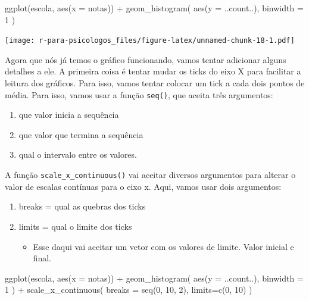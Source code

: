 \documentclass[
]{book}
\newenvironment{Shaded}{\begin{snugshade}}{\end{snugshade}}
\newcommand{\AttributeTok}[1]{\textcolor[rgb]{0.77,0.63,0.00}{#1}}
\newcommand{\DecValTok}[1]{\textcolor[rgb]{0.00,0.00,0.81}{#1}}
\newcommand{\FunctionTok}[1]{\textcolor[rgb]{0.00,0.00,0.00}{#1}}
\newcommand{\NormalTok}[1]{#1}
\newcommand{\SpecialCharTok}[1]{\textcolor[rgb]{0.00,0.00,0.00}{#1}}
\providecommand{\tightlist}{%
  \setlength{\itemsep}{0pt}\setlength{\parskip}{0pt}}
\begin{document}
\begin{Shaded}
\begin{Highlighting}[]
\FunctionTok{ggplot}\NormalTok{(escola, }\FunctionTok{aes}\NormalTok{(}\AttributeTok{x =}\NormalTok{ notas)) }\SpecialCharTok{+} 
  \FunctionTok{geom\_histogram}\NormalTok{(}
    \FunctionTok{aes}\NormalTok{(}\AttributeTok{y =}\NormalTok{ ..count..),}
    \AttributeTok{binwidth =} \DecValTok{1}
\NormalTok{  )}
\end{Highlighting}
\end{Shaded}

\texttt{[image: r-para-psicologos\_files/figure-latex/unnamed-chunk-18-1.pdf]}

Agora que nós já temos o gráfico funcionando, vamos tentar adicionar alguns detalhes a ele. A primeira coisa é tentar mudar os ticks do eixo X para facilitar a leitura dos gráficos. Para isso, vamos tentar colocar um tick a cada dois pontos de média. Para isso, vamos usar a função \texttt{seq()}, que aceita três argumentos:

\begin{enumerate}
\def\labelenumi{\arabic{enumi}.}
\tightlist
\item
  que valor inicia a sequência
\item
  que valor que termina a sequência
\item
  qual o intervalo entre os valores.
\end{enumerate}

A função \texttt{scale\_x\_continuous()} vai aceitar diversos argumentos para alterar o valor de escalas contínuas para o eixo x. Aqui, vamos usar dois argumentos:

\begin{enumerate}
\def\labelenumi{\arabic{enumi}.}
\tightlist
\item
  breaks = qual as quebras dos ticks
\item
  limits = qual o limite dos ticks

  \begin{itemize}
  \tightlist
  \item
    Esse daqui vai aceitar um vetor com os valores de limite. Valor inicial e final.
  \end{itemize}
\end{enumerate}

\begin{Shaded}
\begin{Highlighting}[]
\FunctionTok{ggplot}\NormalTok{(escola, }\FunctionTok{aes}\NormalTok{(}\AttributeTok{x =}\NormalTok{ notas)) }\SpecialCharTok{+} 
  \FunctionTok{geom\_histogram}\NormalTok{(}
    \FunctionTok{aes}\NormalTok{(}\AttributeTok{y =}\NormalTok{ ..count..),}
    \AttributeTok{binwidth =} \DecValTok{1}
\NormalTok{  ) }\SpecialCharTok{+}
  \FunctionTok{scale\_x\_continuous}\NormalTok{(}
    \AttributeTok{breaks =} \FunctionTok{seq}\NormalTok{(}\DecValTok{0}\NormalTok{, }\DecValTok{10}\NormalTok{, }\DecValTok{2}\NormalTok{),}
    \AttributeTok{limits=}\FunctionTok{c}\NormalTok{(}\DecValTok{0}\NormalTok{, }\DecValTok{10}\NormalTok{)}
\NormalTok{  )}
\end{Highlighting}
\end{Shaded}
\end{document}
